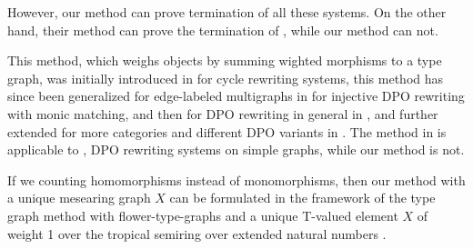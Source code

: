 \begin{example}
\begin{center}
{{
       }
     }
   \end{center}
 \end{example}  
 However, our method can prove termination of all these systems. 
 On the other hand, their method can prove the termination of \cite[Example 6]{plump2018modular}, while our method can not. 

 This method, which weighs objects by summing wighted morphisms to a type graph, was initially introduced in \cite{zantema2014termination} for cycle rewriting systems, this method has since been generalized for edge-labeled multigraphs in \cite{bruggink2014termination} for injective DPO rewriting with monic matching, and then for DPO rewriting in general in \cite{bruggink2015proving}, and further extended for more categories and different DPO variants in \cite{endrullis2023generalized}. The method in \cite{endrullis2023generalized} is applicable to \cite[Examples 6.4, 6.5 and D.4]{EndrullisOverbeek2024Generalized}, DPO rewriting systems on simple graphs, while our method is not.

If we counting homomorphisms instead of monomorphisms, then our method with a unique mesearing graph $X$ can be formulated in the framework of the type graph method with flower-type-graphs \cite[Definition 6]{bruggink2015proving} and a unique T-valued element \cite[Definition 3.1]{EndrullisOverbeek2024Generalized} $X$ of weight 1 over the tropical semiring over extended natural numbers \cite[Example 1]{bruggink2015proving} \cite[Definition 2.7]{EndrullisOverbeek2024Generalized}.
 
